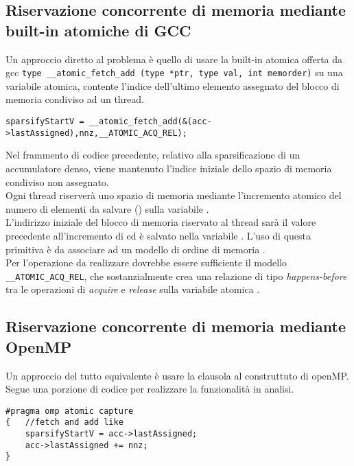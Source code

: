 \subsection[Uso built-in atomiche di GCC]
{Riservazione concorrente di memoria mediante built-in atomiche di GCC}
Un approccio diretto al problema è quello di usare la built-in atomica offerta da gcc
\verb|type __atomic_fetch_add (type *ptr, type val, int memorder)|
su una variabile atomica, contente l'indice dell'ultimo elemento assegnato del blocco di memoria condiviso ad un thread.\\
\begin{lstlisting}
sparsifyStartV = __atomic_fetch_add(&(acc->lastAssigned),nnz,__ATOMIC_ACQ_REL); 
\end{lstlisting}
Nel frammento di codice precedente, relativo alla sparsificazione di un accumulatore denso,
viene mantenuto l'indice iniziale dello spazio di memoria condiviso non assegnato.\\
Ogni thread riserverà uno spazio di memoria mediante l'incremento atomico 
del numero di elementi da salvare () sulla variabile .\\
L'indirizzo iniziale del blocco di memoria riservato al thread sarà il valore precedente all'incremento
di  ed è salvato nella variabile .
\voidLine
L'uso di questa primitiva è da associare ad un modello di ordine di memoria .\\
Per l'operazione da realizzare dovrebbe essere sufficiente il modello \\ \verb|__ATOMIC_ACQ_REL|,
che sostanzialmente crea una relazione di tipo \emph{happens-before} tra le operazioni di 
\emph{acquire} e \emph{release} sulla variabile atomica  \cite{isoc11,gcc10.1}.\\

\subsection[Uso clausola \vvv{capture} di OpenMP]
{Riservazione concorrente di memoria mediante OpenMP}
Un approccio del tutto equivalente è usare la clausola  al construttuto  di openMP.\\
Segue una porzione di codice per realizzare la funzionalità in analisi.
\begin{lstlisting}
#pragma omp atomic capture
{   //fetch and add like 
    sparsifyStartV = acc->lastAssigned;
    acc->lastAssigned += nnz;
}
\end{lstlisting}

